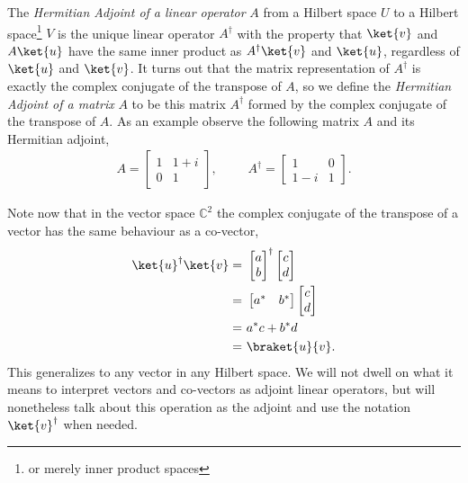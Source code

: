 The \emph{Hermitian Adjoint of a linear operator} $A$ from a Hilbert space $U$ to a Hilbert space\footnote{or merely inner product spaces} $V$ is the unique linear operator $A^\dagger$ with the property that $\ket{v}$ and $A\ket{u}$ have the same inner product as $A^\dagger\ket{v}$ and $\ket{u}$, regardless of $\ket{u}$ and $\ket{v}$. It turns out that the matrix representation of $A^\dagger$ is exactly the complex conjugate of the transpose of $A$, so we define the \emph{Hermitian Adjoint of a matrix} $A$ to be this matrix $A^\dagger$ formed by the complex conjugate of the transpose of $A$. As an example observe the following matrix $A$ and its Hermitian adjoint,
\begin{align*}
	A = \left[\begin{matrix}
		1 & 1+i\\
		0 & 1
	\end{matrix}\right],
	&&&
	A^\dagger = \left[\begin{matrix}
		1 & 0\\
		1-i & 1
	\end{matrix}\right].
\end{align*}

Note now that in the vector space $\mathbb{C}^2$ the complex conjugate of the transpose of a vector has the same behaviour as a co-vector,
\begin{align*}
	\ket{u}^\dagger\ket{v}
	=&\ 
	\left[\begin{matrix}
		a\\
		b
	\end{matrix}\right]^\dagger
	\left[\begin{matrix}
		c\\
		d
	\end{matrix}\right]
	\\=&\ 
	\left[\begin{matrix}
		a^*&b^*
	\end{matrix}\right]
	\left[\begin{matrix}
		c\\
		d
	\end{matrix}\right]
	\\=&\ a^*c+b^*d
	\\=&\ \braket{u}{v}.
\end{align*}
This generalizes to any vector in any Hilbert space. We will not dwell on what it means to interpret vectors and co-vectors as adjoint linear operators, but will nonetheless talk about this operation as the adjoint and use the notation $\ket{v}^\dagger$ when needed.

